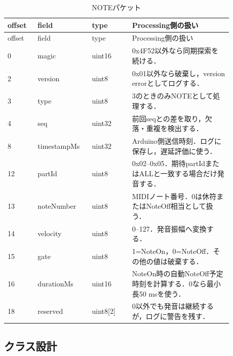 \documentclass[a4paper,11pt]{jsarticle}
\begin{document}
\begin{longtable}{p{0.12\linewidth}p{0.20\linewidth}p{0.16\linewidth}p{0.40\linewidth}}
\caption{NOTEパケット}\label{tab:note-packet}\\
\toprule
offset & field & type & Processing側の扱い \\
\midrule
\endfirsthead
\toprule
offset & field & type & Processing側の扱い \\
\midrule
\endhead
0 & magic & uint16 & 0x4F52以外なら同期探索を続ける． \\
2 & version & uint8 & 0x01以外なら破棄し，version errorとしてログする． \\
3 & type & uint8 & 3のときのみNOTEとして処理する． \\
4 & seq & uint32 & 前回seqとの差を取り，欠落・重複を検出する． \\
8 & timestampMs & uint32 & Arduino側送信時刻．ログに保存し，遅延評価に使う． \\
12 & partId & uint8 & 0x02--0x05．期待partIdまたはALLと一致する場合だけ発音する． \\
13 & noteNumber & uint8 & MIDIノート番号．0は休符またはNoteOff相当として扱う． \\
14 & velocity & uint8 & 0--127．発音振幅へ変換する． \\
15 & gate & uint8 & 1=NoteOn，0=NoteOff．その他の値は破棄する． \\
16 & durationMs & uint16 & NoteOn時の自動NoteOff予定時刻を計算する．0なら最小長50 msを使う． \\
18 & reserved & uint8[2] & 0以外でも発音は継続するが，ログに警告を残す． \\
\bottomrule
\end{longtable}

\subsection{クラス設計}
\end{document}
